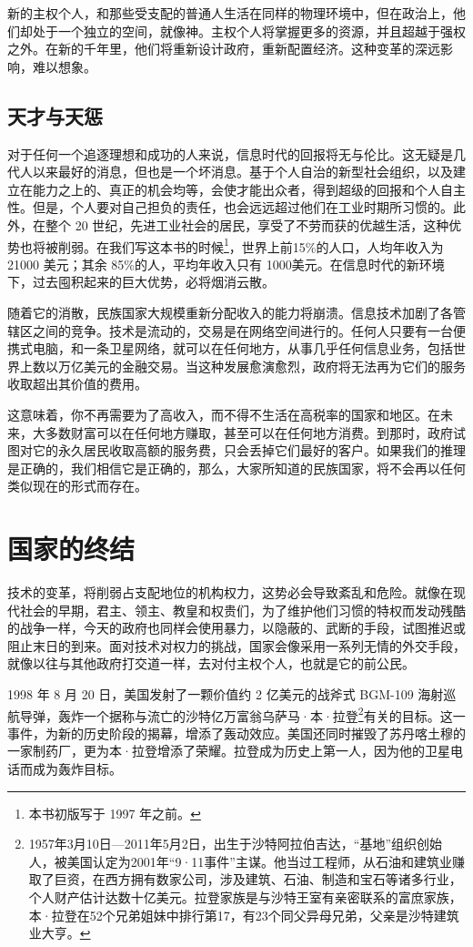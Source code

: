 新的主权个人，和那些受支配的普通人生活在同样的物理环境中，但在政治上，他们却处于一个独立的空间，就像神。主权个人将掌握更多的资源，并且超越于强权之外。在新的千年里，他们将重新设计政府，重新配置经济。这种变革的深远影响，难以想象。



\subsection{天才与天惩}
对于任何一个追逐理想和成功的人来说，信息时代的回报将无与伦比。这无疑是几代人以来最好的消息，但也是一个坏消息。基于个人自治的新型社会组织，以及建立在能力之上的、真正的机会均等，会使才能出众者，得到超级的回报和个人自主性。但是，个人要对自己担负的责任，也会远远超过他们在工业时期所习惯的。此外，在整个 20 世纪，先进工业社会的居民，享受了不劳而获的优越生活，这种优势也将被削弱。在我们写这本书的时候\footnote{本书初版写于 1997 年之前。}，世界上前15\%的人口，人均年收入为 21000 美元；其余 85\%的人，平均年收入只有 1000美元。在信息时代的新环境下，过去囤积起来的巨大优势，必将烟消云散。


随着它的消散，民族国家大规模重新分配收入的能力将崩溃。信息技术加剧了各管辖区之间的竞争。技术是流动的，交易是在网络空间进行的。任何人只要有一台便携式电脑，和一条卫星网络，就可以在任何地方，从事几乎任何信息业务，包括世界上数以万亿美元的金融交易。当这种发展愈演愈烈，政府将无法再为它们的服务收取超出其价值的费用。


这意味着，你不再需要为了高收入，而不得不生活在高税率的国家和地区。在未来，大多数财富可以在任何地方赚取，甚至可以在任何地方消费。到那时，政府试图对它的永久居民收取高额的服务费，只会丢掉它们最好的客户。如果我们的推理是正确的，我们相信它是正确的，那么，大家所知道的民族国家，将不会再以任何类似现在的形式而存在。

\section{国家的终结}
技术的变革，将削弱占支配地位的机构权力，这势必会导致紊乱和危险。就像在现代社会的早期，君主、领主、教皇和权贵们，为了维护他们习惯的特权而发动残酷的战争一样，今天的政府也同样会使用暴力，以隐蔽的、武断的手段，试图推迟或阻止末日的到来。面对技术对权力的挑战，国家会像采用一系列无情的外交手段，就像以往与其他政府打交道一样，去对付主权个人，也就是它的前公民。


1998 年 8 月 20 日，美国发射了一颗价值约 2 亿美元的战斧式 BGM-109 海射巡航导弹，轰炸一个据称与流亡的沙特亿万富翁乌萨马·本·拉登\footnote{1957年3月10日—2011年5月2日，出生于沙特阿拉伯吉达，“基地”组织创始人，被美国认定为2001年“9·11事件”主谋。他当过工程师，从石油和建筑业赚取了巨资，在西方拥有数家公司，涉及建筑、石油、制造和宝石等诸多行业，个人财产估计达数十亿美元。拉登家族是与沙特王室有亲密联系的富庶家族，本·拉登在52个兄弟姐妹中排行第17，有23个同父异母兄弟，父亲是沙特建筑业大亨。}有关的目标。这一事件，为新的历史阶段的揭幕，增添了轰动效应。美国还同时摧毁了苏丹喀土穆的一家制药厂，更为本·拉登增添了荣耀。拉登成为历史上第一人，因为他的卫星电话而成为轰炸目标。


